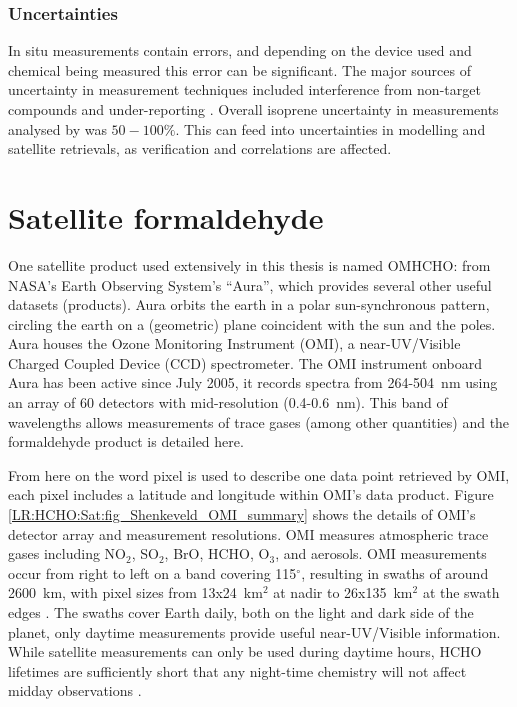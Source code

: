       
    
    \subsubsection{Uncertainties}
    \label{Model:datasets:uncertainties}
      
      In situ measurements contain errors, and depending on the device used and chemical being measured this error can be significant.
      The major sources of uncertainty in measurement techniques included interference from non-target compounds and under-reporting \parencite[e.g.,][]{Dunne2018,Guerette2018}.
      Overall isoprene uncertainty in measurements analysed by \textcite{Dunne2018} was $50 - 100\%$.
      This can feed into uncertainties in modelling and satellite retrievals, as verification and correlations are affected.

\section{Satellite formaldehyde}
\label{Model:omhcho}
  
  One satellite product used extensively in this thesis is named OMHCHO: from NASA's Earth Observing System's ``Aura'', which provides several other useful datasets (products).
  Aura orbits the earth in a polar sun-synchronous pattern, circling the earth on a (geometric) plane coincident with the sun and the poles.
  Aura houses the Ozone Monitoring Instrument (OMI), a near-UV/Visible Charged Coupled Device (CCD) spectrometer.
  The OMI instrument onboard Aura has been active since July 2005, it records spectra from 264-504~nm using an array of 60 detectors with mid-resolution (0.4-0.6~nm).
  This band of wavelengths allows measurements of trace gases (among other quantities) and the formaldehyde product is detailed here.
  
  
  From here on the word pixel is used to describe one data point retrieved by OMI, each pixel includes a latitude and longitude within OMI's data product.
  Figure \ref{LR:HCHO:Sat:fig_Shenkeveld_OMI_summary} shows the details of OMI's detector array and measurement resolutions.
  OMI measures atmospheric trace gases including NO$_2$, SO$_2$, BrO, HCHO, O$_3$, and aerosols.
  OMI measurements occur from right to left on a band covering 115$^{\circ}$, resulting in swaths of around 2600~km, with pixel sizes from 13x24~km$^2$ at nadir to 26x135~km$^2$ at the swath edges \parencite{Abad2015}.
  The swaths cover Earth daily, both on the light and dark side of the planet, only daytime measurements provide useful near-UV/Visible information.
  While satellite measurements can only be used during daytime hours, HCHO lifetimes are sufficiently short that any night-time chemistry will not affect midday observations \parencite{Wolfe2016}.
  
